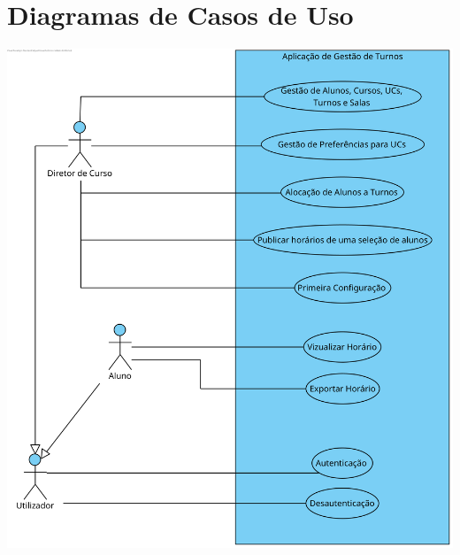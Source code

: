 \documentclass[a4paper,12pt]{scrreprt}
\begin{document}


\chapter{Diagramas de Casos de Uso}
\vspace{1cm}

\begin{minipage}{\textwidth}
    \centering
    \includegraphics[width=1\textwidth]{images/use-cases/diagrams/1-geral.png}
    \label{fig:2-1-diagrama_de_casos_de_uso_geral}
\end{minipage}
\end{document}
